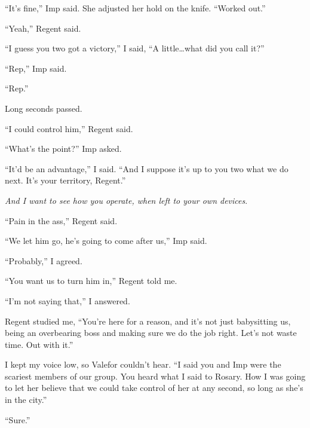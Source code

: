 ``It's fine,'' Imp said.  She adjusted her hold on the knife.  ``Worked out.''



``Yeah,'' Regent said.



``I guess you two got a victory,'' I said, ``A little\ldots what did you call it?''



``Rep,'' Imp said.



``Rep.''



Long seconds passed.



``I could control him,'' Regent said.



``What's the point?'' Imp asked.



``It'd be an advantage,'' I said.  ``And I suppose it's up to you two what we do next.  It's your territory, Regent.''



\emph{And I want to see how you operate, when left to your own devices}.



``Pain in the ass,'' Regent said.



``We let him go, he's going to come after us,'' Imp said.



``Probably,'' I agreed.



``You want us to turn him in,'' Regent told me.



``I'm not saying that,'' I answered.



Regent studied me, ``You're here for a reason, and it's not just babysitting us, being an overbearing boss and making sure we do the job right.  Let's not waste time.  Out with it.''



I kept my voice low, so Valefor couldn't hear.  ``I said you and Imp were the scariest members of our group.  You heard what I said to Rosary.  How I was going to let her believe that we could take control of her at any second, so long as she's in the city.''



``Sure.''



